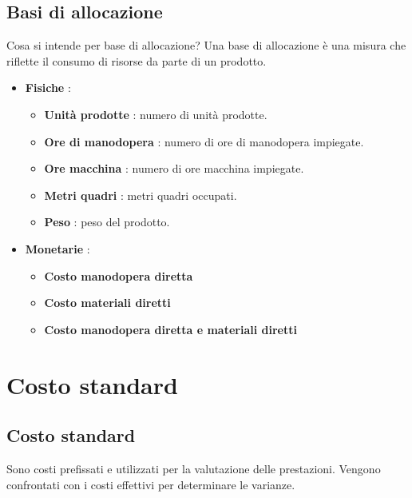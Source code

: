 \documentclass{article}
\begin{document}
\subsection{Basi di allocazione}
Cosa si intende per base di allocazione? Una base di allocazione è una misura che riflette il consumo di risorse da parte di un prodotto.
\begin{itemize}
    \item \textbf{Fisiche} : \begin{itemize}
              \item \textbf{Unità prodotte} : numero di unità prodotte.
              \item \textbf{Ore di manodopera} : numero di ore di manodopera impiegate.
              \item \textbf{Ore macchina} : numero di ore macchina impiegate.
              \item \textbf{Metri quadri} : metri quadri occupati.
              \item \textbf{Peso} : peso del prodotto.
          \end{itemize}
    \item \textbf{Monetarie} :
          \begin{itemize}
              \item \textbf{Costo manodopera diretta}
              \item \textbf{Costo materiali diretti}
              \item \textbf{Costo manodopera diretta e materiali diretti}
          \end{itemize}
\end{itemize}

\newpage

\section{Costo standard}
\subsection*{Costo standard}
Sono costi prefissati e utilizzati per la valutazione delle prestazioni. Vengono confrontati con i costi effettivi per determinare le varianze.
\end{document}
